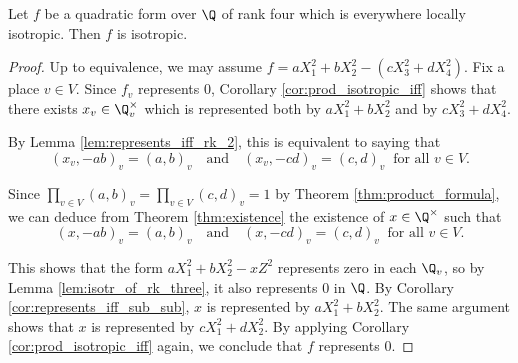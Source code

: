 \begin{lemma}\label{lem:isotr_of_rk_four}
\leanok
Let $f$ be a quadratic form over $\Q$ of rank four which is everywhere locally isotropic. Then $f$ is isotropic.
\end{lemma}
\begin{proof}
\leanok
Up to equivalence, we may assume $f = aX_1^2 + bX_2^2 - (cX_3^2 + dX_4^2)$. Fix a place $v \in V$. Since $f_v$ represents $0$, Corollary \ref{cor:prod_isotropic_iff} shows that there exists $x_v \in \Q_v^\times$ which is represented both by $aX_1^2 + bX_2^2$ and by  $cX_3^2 + dX_4^2$.

By Lemma \ref{lem:represents_iff_rk_2}, this is equivalent to saying that
\[ (x_v, -ab)_v = (a, b)_v \quad \text{and} \quad (x_v, -cd)_v = (c, d)_v \: \text{ for all } v \in V. \]

Since $\displaystyle \prod_{v \in V} (a, b)_v = \prod_{v \in V} (c, d)_v = 1$ by Theorem \ref{thm:product_formula}, we can deduce from Theorem \ref{thm:existence} the existence of $x \in \Q^\times$ such that
\[ (x, -ab)_v = (a, b)_v \quad \text{and} \quad (x, -cd)_v = (c, d)_v \: \text{ for all } v \in V. \]

This shows that the form $aX_1^2 + bX_2^2 - xZ^2$ represents zero in each $\Q_v$, so by Lemma \ref{lem:isotr_of_rk_three}, it also represents $0$ in $\Q$. By Corollary \ref{cor:represents_iff_sub_sub}, $x$ is represented by $aX_1^2 + bX_2^2$. The same argument shows that $x$ is represented by $cX_1^2 + dX_2^2$. By applying Corollary \ref{cor:prod_isotropic_iff} again, we conclude that $f$ represents $0$.
\end{proof}


